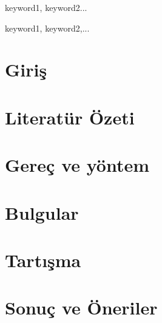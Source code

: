 \documentclass{tubitak}
\begin{document}
\makekapak

\begin{onsoz}
\lipsum[1]
\end{onsoz}

{\hypersetup{linkcolor=black}
\tableofcontents
\listoffigures
\listoftables
}
\clearpage
{}
\begin{ozet}{keyword1, keyword2...}
\lipsum[1-3]
\end{ozet}

\begin{summary}{keyword1, keyword2,...}
\lipsum[1-3]
\end{summary}

\clearpage
{}


\chapter{Giriş}
\lipsum[1-5]

\chapter{Literatür Özeti}
\lipsum[1-5]



\chapter{Gereç ve yöntem}
\lipsum[1-5]

\chapter{Bulgular}
\lipsum[1-5]

\chapter{Tartışma}
\lipsum[1-5]

\chapter{Sonuç ve Öneriler}
\lipsum[1-5]

\clearpage
{}
{} 
\setlength{\parindent}{0pt}            




\end{document}
